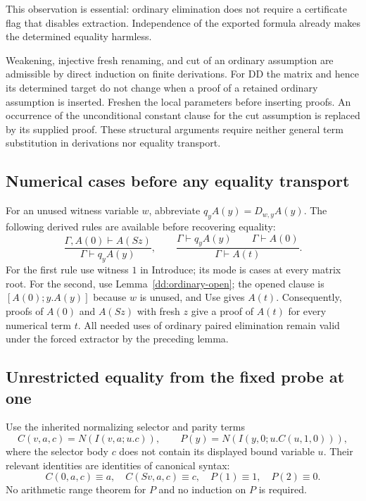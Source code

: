 This observation is essential: ordinary elimination does not require a
certificate flag that disables extraction.  Independence of the exported
formula already makes the determined equality harmless.

Weakening, injective fresh renaming, and cut of an ordinary assumption are
admissible by direct induction on finite derivations.  For DD the matrix
and hence its determined target do not change when a proof of a retained
ordinary assumption is inserted.  Freshen the local parameters before
inserting proofs.  An occurrence of the unconditional constant clause for
the cut assumption is replaced by its supplied proof.  These structural
arguments require neither general term substitution in derivations nor
equality transport.

\subsection{Numerical cases before any equality transport}

For an unused witness variable $w$, abbreviate
$q_yA(y)=D_{w,y}A(y)$.  The following derived rules are available before
recovering equality:
\[
 \frac{\Gamma,A(0)\vdash A(Sz)}{\Gamma\vdash q_yA(y)},
 \qquad
 \frac{\Gamma\vdash q_yA(y)\qquad\Gamma\vdash A(0)}
      {\Gamma\vdash A(t)}.
 \tag{Cases}\label{dd:cases}
\]
For the first rule use witness $1$ in Introduce; its mode is cases at every
matrix root.  For the second, use Lemma~\ref{dd:ordinary-open}; the opened
clause is $[A(0);y.A(y)]$ because $w$ is unused, and Use gives $A(t)$.
Consequently, proofs of $A(0)$ and $A(Sz)$ with fresh $z$ give a proof of
$A(t)$ for every numerical term $t$.  All needed uses of ordinary paired
elimination remain valid under the forced extractor by the preceding lemma.

\subsection{Unrestricted equality from the fixed probe at one}

Use the inherited normalizing selector and parity terms
\[
 C(v,a,c)=N(I(v,a;u.c)),\qquad
 P(y)=N(I(y,0;u.C(u,1,0))),
\]
where the selector body $c$ does not contain its displayed bound variable
$u$.  Their relevant identities are identities of canonical syntax:
\[
 C(0,a,c)\equiv a,\quad C(Sv,a,c)\equiv c,
 \quad P(1)\equiv1,\quad P(2)\equiv0.
\]
No arithmetic range theorem for $P$ and no induction on $P$ is required.

